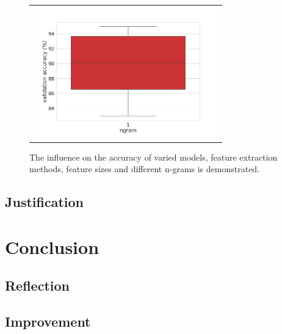 \documentclass[a4paper,12pt,nottoc]{article}
\begin{document}
\begin{figure}[h]
\begin{center}
\begin{tabular}{c c}
\end{tabular}
\begin{tabular}{c}
\includegraphics[width=8cm]{output/ngram_performance.png} \\
\end{tabular}
\end{center}
\caption{The influence on the accuracy of varied models, feature extraction methods, feature sizes and different n-grams is demonstrated.}\label{fig:influenceparams}
\end{figure}

\subsection{Justification}



\section{Conclusion}

\subsection{Reflection}

\subsection{Improvement}
\end{document}
